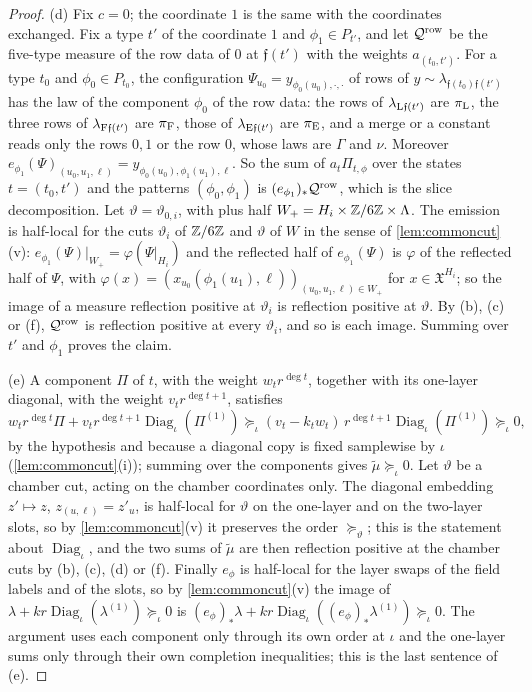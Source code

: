 \begin{proof}
(d) Fix $c=0$; the coordinate $1$ is the same with the coordinates exchanged.
Fix a type $t'$ of the coordinate $1$ and $\phi_1\in P_{t'}$, and let
$\mathcal Q^{\rm row}$ be the five-type measure of the row data of $0$ at
$\mathfrak f(t')$ with the weights $a_{(t_0,t')}$. For a type $t_0$ and
$\phi_0\in P_{t_0}$, the configuration $\Psi_{u_0}=y_{\phi_0(u_0),\cdot,\cdot}$ of
rows of $y\sim\lambda_{\mathfrak f(t_0)\mathfrak f(t')}$ has the law of the
component $\phi_0$ of the row data: the rows of $\lambda_{{\rm L}\mathfrak f(t')}$
are $\pi_{\rm L}$, the three rows of $\lambda_{{\rm F}\mathfrak f(t')}$ are
$\pi_{\rm F}$, those of $\lambda_{{\rm E}\mathfrak f(t')}$ are $\pi_{\rm E}$, and
a merge or a constant reads only the rows $0,1$ or the row $0$, whose laws
are $\Gamma$ and $\nu$. Moreover
$e_{\phi_1}(\Psi)_{(u_0,u_1,\ell)}=y_{\phi_0(u_0),\phi_1(u_1),\ell}$. So the sum
of $a_t\Pi_{t,\phi}$ over the states $t=(t_0,t')$ and the patterns
$(\phi_0,\phi_1)$ is $(e_{\phi_1})_*\mathcal Q^{\rm row}$, which is the slice
decomposition. Let $\vartheta=\vartheta_{0,i}$, with plus half
$W_+=H_i\times\mathbb Z/6\mathbb Z\times\Lambda$. The emission is half-local for the cuts
$\vartheta_i$ of $\mathbb Z/6\mathbb Z$ and $\vartheta$ of $W$ in the sense of
\cref{lem:commoncut}(v): $e_{\phi_1}(\Psi)|_{W_+}=\varphi(\Psi|_{H_i})$ and the
reflected half of $e_{\phi_1}(\Psi)$ is $\varphi$ of the reflected half of
$\Psi$, with
$\varphi(x)=(x_{u_0}(\phi_1(u_1),\ell))_{(u_0,u_1,\ell)\in W_+}$ for
$x\in\mathfrak X^{H_i}$; so the image of a measure reflection positive at
$\vartheta_i$ is reflection positive at $\vartheta$. By (b), (c) or (f),
$\mathcal Q^{\rm row}$ is reflection positive at every $\vartheta_i$, and so is
each image. Summing over $t'$ and $\phi_1$ proves the claim.

(e) A component $\Pi$ of $t$, with the weight $w_tr^{\deg t}$, together with
its one-layer diagonal, with the weight $v_tr^{\deg t+1}$, satisfies
\[
 w_tr^{\deg t}\Pi+v_tr^{\deg t+1}\operatorname{Diag}_\iota(\Pi^{(1)})
 \succeq_\iota(v_t-k_tw_t)\,r^{\deg t+1}\operatorname{Diag}_\iota(\Pi^{(1)})
 \succeq_\iota0,
\]
by the hypothesis and because a diagonal copy is fixed samplewise by $\iota$
(\cref{lem:commoncut}(i)); summing over the components gives
$\widetilde\mu\succeq_\iota0$. Let $\vartheta$ be a chamber cut, acting on the
chamber coordinates only. The diagonal embedding $z'\mapsto z$,
$z_{(u,\ell)}=z'_u$, is half-local for $\vartheta$ on the one-layer and on the
two-layer slots, so by \cref{lem:commoncut}(v) it preserves the order
$\succeq_\vartheta$; this is the statement about $\operatorname{Diag}_\iota$, and
the two sums of $\widetilde\mu$
are then reflection positive at the chamber cuts by (b), (c), (d) or (f). Finally
$e_\phi$ is half-local for the layer swaps of the field labels and of the
slots, so by \cref{lem:commoncut}(v) the image of
$\lambda+kr\operatorname{Diag}_\iota(\lambda^{(1)})\succeq_\iota0$ is
$(e_\phi)_*\lambda+kr\operatorname{Diag}_\iota((e_\phi)_*\lambda^{(1)})\succeq_\iota0$.
The argument uses each component only through its own order at $\iota$ and
the one-layer sums only through their own completion inequalities; this is
the last sentence of (e).


\end{proof}
